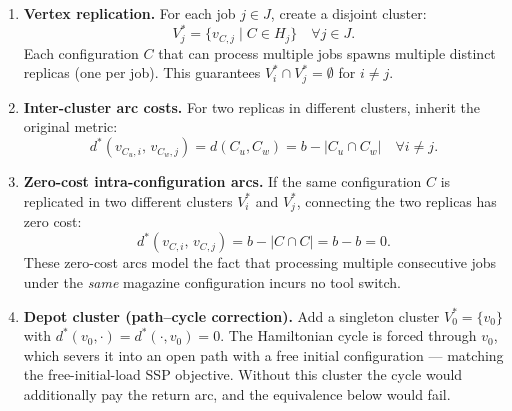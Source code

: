 \documentclass[11pt,a4paper]{article}
\theoremstyle{plain}
\theoremstyle{definition}
\begin{document}
\begin{enumerate}
\item \textbf{Vertex replication.}
For each job $j \in J$, create a disjoint cluster:
\[
  V_j^* = \{ v_{C,j} \mid C \in H_j \} \quad \forall j \in J.
\]
Each configuration $C$ that can process multiple jobs spawns multiple distinct
replicas (one per job). This guarantees $V_i^* \cap V_j^* = \emptyset$ for $i \ne j$.

\item \textbf{Inter-cluster arc costs.}
For two replicas in different clusters, inherit the original metric:
\[
  d^*(v_{C_u,i},\, v_{C_w,j}) = d(C_u, C_w) = b - |C_u \cap C_w|
  \quad \forall i \ne j.
\]

\item \textbf{Zero-cost intra-configuration arcs.}
If the same configuration $C$ is replicated in two different clusters $V_i^*$
and $V_j^*$, connecting the two replicas has zero cost:
\[
  d^*(v_{C,i},\, v_{C,j}) = b - |C \cap C| = b - b = 0.
\]
These zero-cost arcs model the fact that processing multiple consecutive jobs
under the \emph{same} magazine configuration incurs no tool switch.

\item \textbf{Depot cluster (path--cycle correction).}
Add a singleton cluster $V_0^*=\{v_0\}$ with
$d^*(v_0,\cdot)=d^*(\cdot,v_0)=0$. The Hamiltonian cycle is forced through
$v_0$, which severs it into an open path with a free initial configuration ---
matching the free-initial-load SSP objective. Without this cluster the cycle
would additionally pay the return arc, and the equivalence below would fail.
\end{enumerate}
\end{document}
